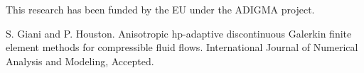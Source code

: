 This research has been funded by the EU under the ADIGMA project.


\begin{thebibliography}{10}

{\sc S. Giani and P. Houston}. {Anisotropic hp-adaptive discontinuous Galerkin finite element methods for compressible fluid flows}. International Journal of Numerical Analysis and Modeling, Accepted.

\end{thebibliography}
